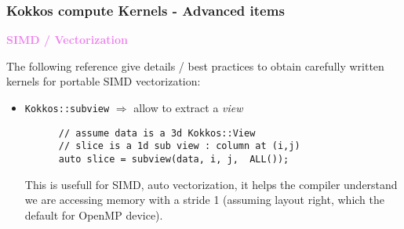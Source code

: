 \begin{frame}[fragile=singleslide]
  \frametitle{Kokkos compute Kernels - Advanced items}
  
  {\Large \textcolor{violet}{\textbf{SIMD / Vectorization}}}

  The following reference give details / best practices to obtain carefully written kernels for portable SIMD vectorization:\\

  \begin{itemize}
  \item \texttt{Kokkos::subview} $\Rightarrow$ allow to extract a {\it view}
    \begin{verbatim}
      // assume data is a 3d Kokkos::View
      // slice is a 1d sub view : column at (i,j)
      auto slice = subview(data, i, j,  ALL());
    \end{verbatim}
    This is usefull for SIMD, auto vectorization, it helps the compiler understand we are accessing
    memory with a stride 1 (assuming layout right, which the default for OpenMP device).
  \end{itemize}
  
  
\end{frame}
